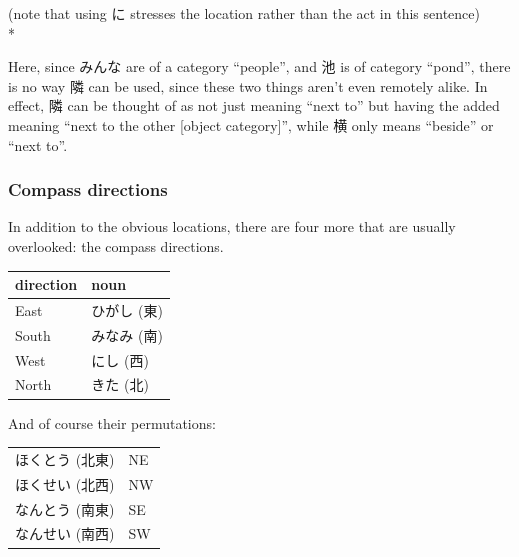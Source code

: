 \documentclass[11pt, b5paper, twoside, openright, onecolumn]{book}
\makeatletter
\newcommand*{\rtrubystack}[2]{{\relscale{0.5}%
  \begin{tabular}[b]{@{}c@{}}%
    {#1}\\%
    {\textscale{2}{#2}}%
  \end{tabular}}%
}
\DeclareRobustCommand*{\rtruby}[2]{%
  \mbox{%
    \setlength{\parskip}{0ex}%
    \BeginAccSupp{method=pdfstringdef,ActualText={#1}}%
      \rtrubystack{\phantom{#2}}{#1}%
      \llap{%
        \rtrubystack{#2}{\phantom{#1}}%
      }%
    \EndAccSupp{}%
  }%
}
\renewcommand*{\rtruby}[2]{#2 (#1)}%
\newenvironment{exampleblock}{
\setlength{\parindent}{0.6in}
\begin{minipage}[t]{\dimexpr\textwidth-\parindent}}
{\end{minipage}}
\newenvironment{mytabular}[1]{\noindent\hspace{0.4in}
\begin{tabular}[h]{#1}}{\end{tabular}}
\makeatother
\begin{document}
\begin{exampleblock}
(note that using に stresses the location rather than the act in this sentence) \\* 
\end{exampleblock}
\vspace{0.2cm}

Here‚ since みんな are of a category “people”‚ and 池 is of category “pond”‚ there is no way 隣 can be used‚ since these two things aren’t even remotely alike. In effect‚ 隣 can be thought of as not just meaning “next to” but having the added meaning “next to the other [object category]”‚ while 横 only means “beside” or “next to”.

\subsubsection{Compass directions}

In addition to the obvious locations‚ there are four more that are usually overlooked: the compass directions.

\vspace{0.5cm}
\smaller
\begin{mytabular}{| l  l |}\hline 
\rule{0pt}{2.4ex}direction & noun\\ 
\hline
\rule{0pt}{3.6ex}\index[english]{East}East & \index[japanese]{ひがし (東)}\rtruby{東}{ひがし}\\ 
\rule{0pt}{3.6ex}\index[english]{South}South & \index[japanese]{みなみ (南)}\rtruby{南}{みなみ}\\ 
\rule{0pt}{3.6ex}\index[english]{West}West & \index[japanese]{にし (西)}\rtruby{西}{にし}\\ 
\rule{0pt}{3.6ex}\index[english]{North}North & \index[japanese]{きた (北)}\rtruby{北}{きた}\\ 
\hline 
\end{mytabular}
\larger
\vspace{0.5cm}


And of course their permutations:

\vspace{0.5cm}
\smaller
\begin{mytabular}{| l  l |}\hline 
\rule{0pt}{3.6ex}\rtruby{北東}{ほくとう} & NE\\ 
\rule{0pt}{3.6ex}\rtruby{北西}{ほくせい} & NW\\ 
\rule{0pt}{3.6ex}\rtruby{南東}{なんとう} & SE\\ 
\rule{0pt}{3.6ex}\rtruby{南西}{なんせい} & SW\\ 
\hline 
\end{mytabular}
\larger
\end{document}
